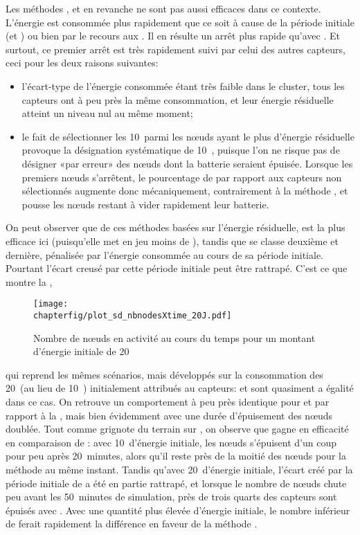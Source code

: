 Les méthodes \ideres, \iddemx et \iddems en revanche ne sont pas aussi efficaces dans ce contexte.
L'énergie est consommée plus rapidement que ce soit à cause de la période initiale (\iddemx et \iddems) ou bien par le recours aux \vns.
Il en résulte un arrêt plus rapide qu'avec \idrand.
Et surtout, ce premier arrêt est très rapidement suivi par celui des autres capteurs, ceci pour les deux raisons suivantes:
\begin{itemize}
    \item l'écart-type de l'énergie consommée étant très faible dans le cluster, tous les capteurs ont à peu près la même consommation, et leur énergie résiduelle atteint un niveau nul au même moment;
    \item le fait de sélectionner les 10~\cns parmi les nœuds ayant le plus d'énergie résiduelle provoque la désignation systématique de 10~\cns, puisque l'on ne risque pas de désigner «par erreur» des nœuds dont la batterie seraient épuisée. Lorsque les premiers nœuds s'arrêtent, le pourcentage de \cns par rapport aux capteurs non sélectionnés augmente donc mécaniquement, contrairement à la méthode \idrand, et pousse les nœuds restant à vider rapidement leur batterie.
\end{itemize}

On peut observer que de ces méthodes basées sur l'énergie résiduelle, \iddems est la plus efficace ici (puisqu'elle met en jeu moins de \cns), tandis que \ideres se classe deuxième et \iddemx dernière, pénalisée par l'énergie consommée au cours de sa période initiale.
Pourtant l'écart creusé par cette période initiale peut être rattrapé.
C'est ce que montre la ,
\begin{figure}[!t]
    \centering
    \texttt{[image: \\chapterfig/plot\_sd\_nbnodesXtime\_20J.pdf]}
    \caption{Nombre de nœuds en activité au cours du temps pour un montant d'énergie initiale de 20~\joule}\label{sd:fig:nbnodes-20J}
\end{figure}
qui reprend les mêmes scénarios, mais développés sur la consommation des 20~\joule (au lieu de 10~\joule) initialement attribués au capteurs: \iddemx et \ideres sont quasiment a égalité dans ce cas.
On retrouve un comportement à peu près identique pour \idstat et \idrand par rapport à la , mais bien évidemment avec une durée d'épuisement des nœuds doublée.
Tout comme \iddemx grignote du terrain sur \ideres, on observe que \iddems gagne en efficacité en comparaison de \idrand: avec 10~\joule d'énergie initiale, les nœuds s'épuisent d'un coup pour \iddems peu après 20~minutes, alors qu'il reste près de la moitié des nœuds pour la méthode \idrand au même instant.
Tandis qu'avec 20~\joule d'énergie initiale, l'écart créé par la période initiale de \iddems a été en partie rattrapé, et lorsque le nombre de nœuds chute peu avant les 50~minutes de simulation, près de trois quarts des capteurs sont épuisés avec \idrand.
Avec une quantité plus élevée d'énergie initiale, le nombre inférieur de \cns ferait rapidement la différence en faveur de la méthode \iddems.

